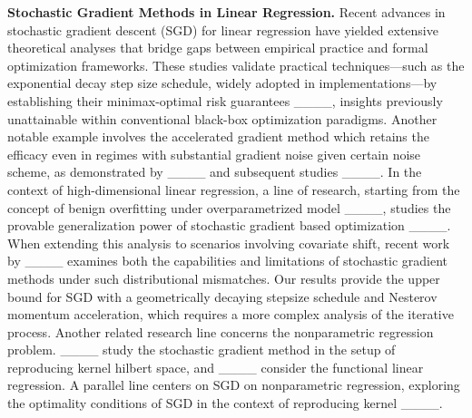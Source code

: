 \noindent\textbf{Stochastic Gradient Methods in Linear Regression.}
Recent advances in stochastic gradient descent (SGD) for linear regression have yielded extensive theoretical analyses that bridge gaps between empirical practice and formal optimization frameworks. These studies validate practical techniques—such as the exponential decay step size schedule, widely adopted in implementations—by establishing their minimax-optimal risk guarantees ____, insights previously unattainable within conventional black-box optimization paradigms. Another notable example involves the accelerated gradient method which retains the efficacy even in regimes with substantial gradient noise given certain noise scheme, as demonstrated by ____ and subsequent studies ____.
In the context of high-dimensional linear regression, a line of research, starting from the concept of benign overfitting under overparametrized model ____, studies the provable generalization power of stochastic gradient based optimization ____. 
When extending this analysis to scenarios involving covariate shift, recent work by ____ examines both the capabilities and limitations of stochastic gradient methods under such distributional mismatches.
Our results provide the upper bound for SGD with a geometrically decaying stepsize schedule and Nesterov momentum acceleration, which requires a more complex analysis of the iterative process. 
Another related research line concerns the nonparametric regression problem. ____ study the stochastic gradient method in the setup of reproducing kernel hilbert space, and ____ consider the functional linear regression.
A parallel line centers on SGD on nonparametric regression, exploring the optimality conditions of SGD in the context of reproducing kernel ____.